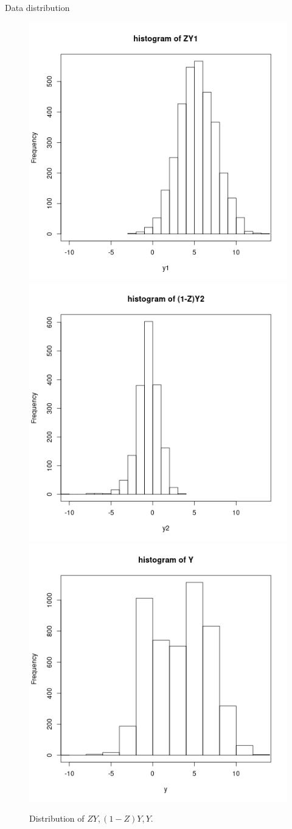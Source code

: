 \documentclass[professionalfont]{beamer}
\begin{document}
\begin{frame}{Data distribution}
\begin{figure}[htp!]
	\centering
	\includegraphics[width=0.3\linewidth]{../plots/two_gaussians/yone}
	\includegraphics[width=0.3\linewidth]{../plots/two_gaussians/ytwo}
	\includegraphics[width=0.3\linewidth]{../plots/two_gaussians/y}
	\caption{Distribution of $ZY,(1-Z)Y,Y$.}\label{norm-hist-y}
\end{figure}
\end{frame}
\end{document}
